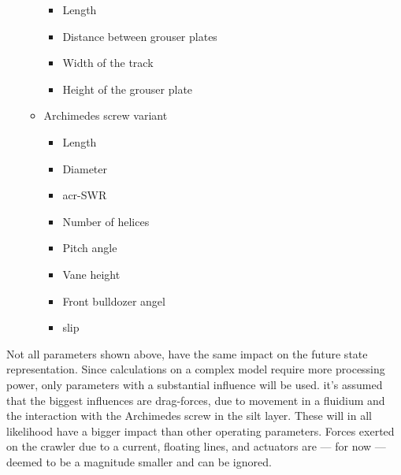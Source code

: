 \begin{itemize}
\begin{itemize}
\begin{itemize}
            \item Length\footnotemark[\getrefnumber{c}]
            \item Distance between grouser plates\footnotemark[\getrefnumber{c}]
            \item Width of the track\footnotemark[\getrefnumber{c}]
            \item Height of the grouser plate\footnotemark[\getrefnumber{c}]
        \end{itemize}
        \item Archimedes screw variant \cite{van_der_zee_prediction_2009}
        \begin{itemize}
            \setlength\itemsep{0mm}
            \item Length\footnotemark[\getrefnumber{c}]
            \item Diameter\footnotemark[\getrefnumber{c}]
            \item \gls{acr-SWR}\footnotemark[\getrefnumber{c}]
            \item Number of helices\footnotemark[\getrefnumber{c}]
            \item Pitch angle\footnotemark[\getrefnumber{c}]
            \item Vane height\footnotemark[\getrefnumber{c}]
            \item Front bulldozer angel\footnotemark[\getrefnumber{c}]
            \item slip
        \end{itemize}
    \end{itemize}
\end{itemize}

Not all parameters shown above, have the same impact on the future state representation. Since calculations on a complex
model require more processing power, only parameters with a substantial influence will be used. it's assumed that the
biggest influences are drag-forces, due to movement in a fluidium and the interaction with the Archimedes screw in the
silt layer. These will in all likelihood have a bigger impact than other operating parameters. Forces exerted on the
crawler due to a current, floating lines, and actuators are --- for now --- deemed to be a magnitude smaller and can
be ignored.

